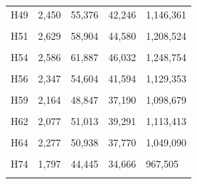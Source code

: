 \documentclass[
  a4paper,
  titlepage]{article}
\begin{document}
\begin{longtable}[t]{lllll}
H49 & 2,450 & 55,376 & 42,246 & 1,146,361\\
 
\cellcolor{gray!6}{H50} & \cellcolor{gray!6}{2,568} & \cellcolor{gray!6}{58,680} & \cellcolor{gray!6}{44,336} & \cellcolor{gray!6}{1,291,489}\\
 
H51 & 2,629 & 58,904 & 44,580 & 1,208,524\\
 
\cellcolor{gray!6}{H52} & \cellcolor{gray!6}{2,766} & \cellcolor{gray!6}{63,936} & \cellcolor{gray!6}{48,140} & \cellcolor{gray!6}{1,308,753}\\
 
H54 & 2,586 & 61,887 & 46,032 & 1,248,754\\
 
\cellcolor{gray!6}{H55} & \cellcolor{gray!6}{2,680} & \cellcolor{gray!6}{61,944} & \cellcolor{gray!6}{46,604} & \cellcolor{gray!6}{1,282,893}\\
 
H56 & 2,347 & 54,604 & 41,594 & 1,129,353\\
 
\cellcolor{gray!6}{H58} & \cellcolor{gray!6}{2,200} & \cellcolor{gray!6}{50,458} & \cellcolor{gray!6}{38,870} & \cellcolor{gray!6}{1,057,447}\\
 
H59 & 2,164 & 48,847 & 37,190 & 1,098,679\\
 
\cellcolor{gray!6}{H61} & \cellcolor{gray!6}{2,273} & \cellcolor{gray!6}{51,290} & \cellcolor{gray!6}{38,539} & \cellcolor{gray!6}{1,044,128}\\
 
H62 & 2,077 & 51,013 & 39,291 & 1,113,413\\
 
\cellcolor{gray!6}{H63} & \cellcolor{gray!6}{2,869} & \cellcolor{gray!6}{64,636} & \cellcolor{gray!6}{48,238} & \cellcolor{gray!6}{1,343,563}\\
 
H64 & 2,277 & 50,938 & 37,770 & 1,049,090\\
 
\cellcolor{gray!6}{H70} & \cellcolor{gray!6}{2,816} & \cellcolor{gray!6}{64,620} & \cellcolor{gray!6}{48,064} & \cellcolor{gray!6}{1,351,477}\\
 
H74 & 1,797 & 44,445 & 34,666 & 967,505\\
 
\cellcolor{gray!6}{H76} & \cellcolor{gray!6}{2,446} & \cellcolor{gray!6}{57,547} & \cellcolor{gray!6}{43,129} & \cellcolor{gray!6}{1,159,433}\\
 

\end{longtable}
\end{document}
